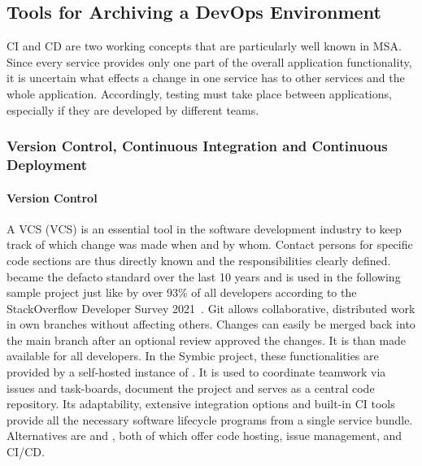 \documentclass[12pt, a4paper]{article}
\begin{document}
    \subsection{Tools for Archiving a DevOps Environment}\label{ssec::getting_devops}
    \acl{CI} and \acl{CD} are two working concepts that are particularly well known in \ac{MSA}. Since every service provides only one part of the overall application functionality, it is uncertain what effects a change in one service has to other services and the whole application. Accordingly, testing must take place between applications, especially if they are developed by different teams.

    \subsubsection{Version Control, Continuous Integration and Continuous Deployment}
        \paragraph{Version Control}
        A \acl{VCS} (\ac{VCS}) is an essential tool in the software development industry to keep track of which change was made when and by whom. Contact persons for specific code sections are thus directly known and the responsibilities clearly defined.  became the defacto standard over the last 10 years and is used in the following sample project just like by over 93\% of all developers according to the StackOverflow Developer Survey 2021~\cite{stackoverflow2018}. Git allows collaborative, distributed work in own branches without affecting others. Changes can easily be merged back into the main branch after an optional review approved the changes. It is than made available for all developers. In the Symbic project, these functionalities are provided by a self-hosted instance of . It is used to coordinate teamwork via issues and task-boards, document the project and serves as a central code repository. Its adaptability, extensive integration options and built-in \acs{CI} tools provide all the necessary software lifecycle programs from a single service bundle. Alternatives are  and , both of which offer code hosting, issue management, and \ac{CI}/\ac{CD}.
\end{document}
